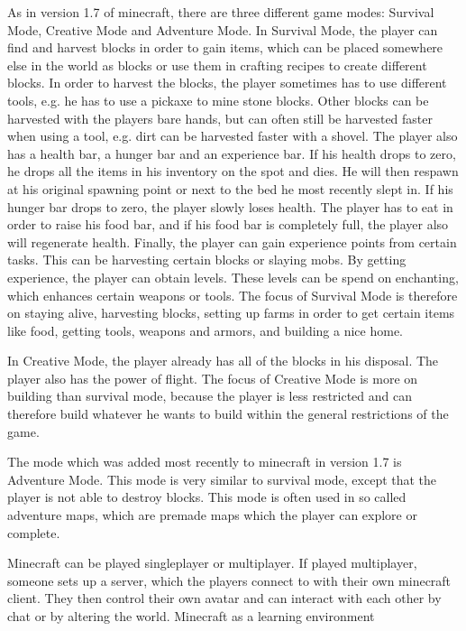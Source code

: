 \documentclass[12pt]{report} %
\begin{document}
As in version 1.7 of minecraft, there are three different game modes: Survival Mode, Creative Mode and Adventure Mode. In Survival Mode, the player can find and harvest blocks in order to gain items, which can be placed somewhere else in the world as blocks or use them in crafting recipes to create different blocks. In order to harvest the blocks, the player sometimes has to use different tools, e.g. he has to use a pickaxe to mine stone blocks. Other blocks can be harvested with the players bare hands, but can often still be harvested faster when using a tool, e.g. dirt can be harvested faster with a shovel. The player also has a health bar, a hunger bar and an experience bar. If his health drops to zero, he drops all the items in his inventory on the spot and dies. He will then respawn at his original spawning point or next to the bed he most recently slept in. If his hunger bar drops to zero, the player slowly loses health. The player has to eat in order to raise his food bar, and if his  food bar is completely full, the player also will regenerate health. Finally, the player can gain experience points from certain tasks. This can be harvesting certain blocks or slaying mobs. By getting experience, the player can obtain levels. These levels can be spend on enchanting, which enhances certain weapons or tools. The focus of Survival Mode is therefore on staying alive, harvesting blocks, setting up farms in order to get certain items like food, getting tools, weapons and armors, and building a nice home.

In Creative Mode, the player already has all of the blocks in his disposal. The player also has the power of flight. The focus of Creative Mode is more on building than survival mode, because the player is less restricted and can therefore build whatever he wants to build within  the general restrictions of the game.

The mode which was added most recently to minecraft in version 1.7 is Adventure Mode. This mode is very similar to survival mode, except that the player is not able to destroy blocks. This mode is often used in so called adventure maps, which are premade maps which the player can explore or complete.

Minecraft can be played singleplayer or multiplayer. If played multiplayer, someone sets up a server, which the players connect to with their own minecraft client. They then control their own avatar and can interact with each other by chat or by altering the world.
Minecraft as a learning environment
\end{document}
